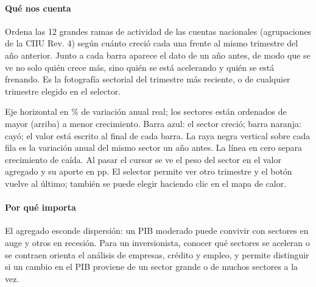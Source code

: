 \paragraph{Qué nos cuenta}
Ordena las 12 grandes ramas de actividad de las cuentas nacionales (agrupaciones de la CIIU Rev. 4) según cuánto creció cada una frente al mismo trimestre del año anterior. Junto a cada barra aparece el dato de un año antes, de modo que se ve no solo quién crece más, sino quién se está acelerando y quién se está frenando. Es la fotografía sectorial del trimestre más reciente, o de cualquier trimestre elegido en el selector.

\begin{leer}
Eje horizontal en \% de variación anual real; los sectores están ordenados de mayor (arriba) a menor crecimiento. Barra azul: el sector creció; barra naranja: cayó; el valor está escrito al final de cada barra. La raya negra vertical sobre cada fila es la variación anual del mismo sector un año antes. La línea en cero separa crecimiento de caída. Al pasar el cursor se ve el peso del sector en el valor agregado y su aporte en pp. El selector permite ver otro trimestre y el botón vuelve al último; también se puede elegir haciendo clic en el mapa de calor.
\end{leer}

\paragraph{Por qué importa}
El agregado esconde dispersión: un PIB moderado puede convivir con sectores en auge y otros en recesión. Para un inversionista, conocer qué sectores se aceleran o se contraen orienta el análisis de empresas, crédito y empleo, y permite distinguir si un cambio en el PIB proviene de un sector grande o de muchos sectores a la vez.

